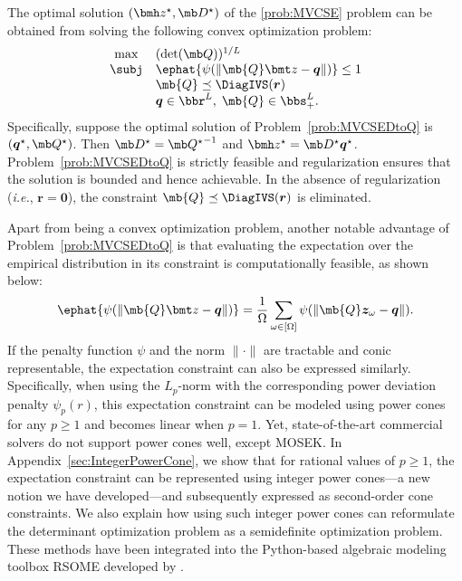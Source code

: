 \documentclass[opre, blindrev]{informs4}
\newcommand{\1}[1]{\mathds{1}{\left(#1\right)}}
\begin{document}
\begin{theorem}
\label{chap8:thm:MinimumVolumeDtoQ}
The optimal solution $(\bmh z^\star, \mb D^\star)$ of the \ref{prob:MVCSE} problem can be obtained from solving the following convex optimization problem:
\begin{equation}
\label{prob:MVCSEDtoQ}
\begin{array}{cll}
\max & (\det(\mb Q))^{1/L} \\
\subj & \ephat{\psi(\|\mb{Q} \bmt z - \bm q \|)} \leq 1 \\
& \mb{Q} \preceq \DiagIVS(\bm r) \\
& \bm q \in \bbr^L, \; \mb{Q} \in \bbs^{L}_{+}.  
\end{array} 
\end{equation}
Specifically, suppose the optimal solution of Problem~\eqref{prob:MVCSEDtoQ} is $(\bm q^\star,\mb Q^\star)$. Then $\mb D^\star = {\mb Q^\star}^{-1}$ and $\bmh z^\star = \mb D^\star \bm q^\star$. Problem~\eqref{prob:MVCSEDtoQ} is strictly feasible and regularization ensures that the solution is bounded and hence achievable. In the absence of regularization (\textit{i.e.}, $\bm r =\bm 0$), the constraint $\mb{Q} \preceq \DiagIVS(\bm r)$ is eliminated.    
\end{theorem}

Apart from being a convex optimization problem, another notable advantage of Problem~\eqref{prob:MVCSEDtoQ} is that evaluating the expectation over the empirical distribution in its constraint is computationally feasible, as shown below:
$$
\ephat{\psi(\|\mb{Q} \bmt z - \bm q \|)} = \frac{1}{\Omega} \sum_{\omega \in [\Omega]} \psi(\|\mb{Q} \bm z_\omega - \bm q \|). 
$$
If the penalty function $\psi$ and the norm $\|\cdot\|$ are tractable and conic representable, the expectation constraint can also be expressed similarly. Specifically, when using the $L_p$-norm with the corresponding power deviation penalty $\psi_p(r)$, this expectation constraint can be modeled using power cones for any $p \geq 1$ and becomes linear when $p = 1$. Yet, state-of-the-art commercial solvers do not support power cones well, except MOSEK. In Appendix~\ref{sec:IntegerPowerCone}, we show that for rational values of \(p \geq 1\), the expectation constraint can be represented using integer power cones---a new notion we have developed---and subsequently expressed as second-order cone constraints. We also explain how using such integer power cones can reformulate the determinant optimization problem as a semidefinite optimization problem. These methods have been integrated into the Python-based algebraic modeling toolbox RSOME developed by \cite{Chen_Xiong_rsome}.
\end{document}
